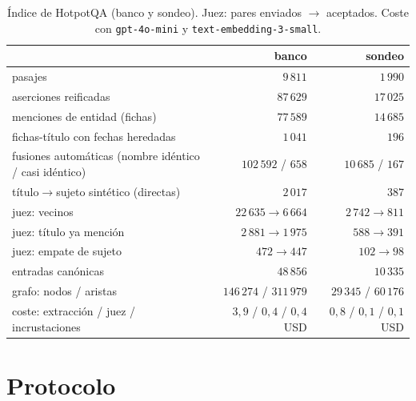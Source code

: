 \documentclass[11pt,a4paper]{article}
\begin{document}
\begin{table}[t]
\centering\footnotesize\setlength{\tabcolsep}{5pt}
\caption{Índice de HotpotQA (banco y sondeo). Juez: pares enviados $\to$
aceptados. Coste con \texttt{gpt-4o-mini} y \texttt{text-embedding-3-small}.}
\label{tab:indice}
\begin{tabular}{lrr}
\toprule
 & banco & sondeo\\
\midrule
pasajes & $9\,811$ & $1\,990$\\
aserciones reificadas & $87\,629$ & $17\,025$\\
menciones de entidad (fichas) & $77\,589$ & $14\,685$\\
fichas-título con fechas heredadas & $1\,041$ & $196$\\
fusiones automáticas (nombre idéntico / casi idéntico) & $102\,592$ / $658$ & $10\,685$ / $167$\\
título$\to$sujeto sintético (directas) & $2\,017$ & $387$\\
juez: vecinos & $22\,635 \to 6\,664$ & $2\,742 \to 811$\\
juez: título ya mención & $2\,881 \to 1\,975$ & $588 \to 391$\\
juez: empate de sujeto & $472 \to 447$ & $102 \to 98$\\
entradas canónicas & $48\,856$ & $10\,335$\\
grafo: nodos / aristas & $146\,274$ / $311\,979$ & $29\,345$ / $60\,176$\\
coste: extracción / juez / incrustaciones & $3{,}9$ / $0{,}4$ / $0{,}4$ USD & $0{,}8$ / $0{,}1$ / $0{,}1$ USD\\
\bottomrule
\end{tabular}
\end{table}

\section{Protocolo}
\label{sec:protocolo}
\end{document}
